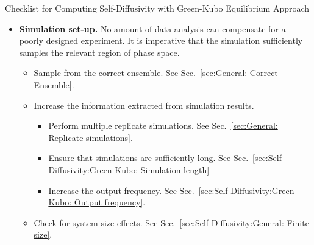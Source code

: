 \documentclass[9pt,bestpractices]{livecoms}
\begin{document}
\begin{Checklists*}[p!]
	\begin{checklist}{Checklist for Computing Self-Diffusivity with Green-Kubo Equilibrium Approach}
		\begin{itemize}
			\item
			\textbf{Simulation set-up.} No amount of data analysis can compensate for a poorly designed experiment. It is imperative that the simulation sufficiently samples the relevant region of phase space.
			\begin{itemize}
				\item Sample from the correct ensemble. See Sec.\ \ref{sec:General: Correct Ensemble}.
				\item Increase the information extracted from simulation results.
				\begin{itemize}
					\item Perform multiple replicate simulations. See Sec.\ \ref{sec:General: Replicate simulations}.
					\item Ensure that simulations are sufficiently long. See Sec.\ \ref{sec:Self-Diffusivity:Green-Kubo: Simulation length}
					\item Increase the output frequency. See Sec.\ \ref{sec:Self-Diffusivity:Green-Kubo: Output frequency}.
				\end{itemize}
				\item Check for system size effects. See Sec.\ \ref{sec:Self-Diffusivity:General: Finite size}.
			\end{itemize}
			\vspace{-0.325\baselineskip} %


\end{itemize}
\end{checklist}
\end{Checklists*}
\end{document}
